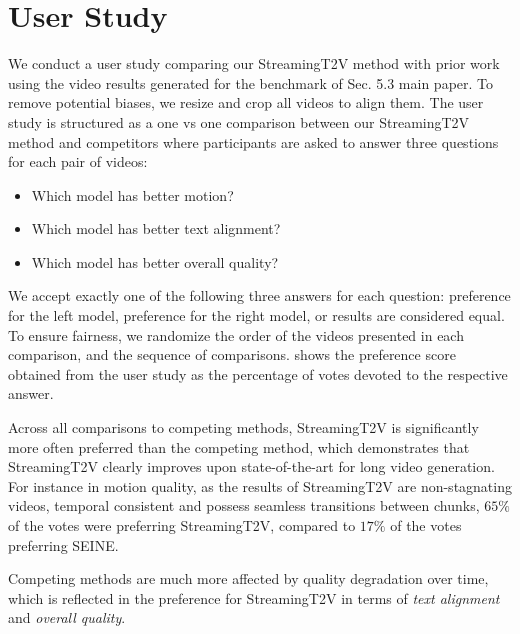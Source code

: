 \section{User Study}
\label{appendix:sec:user_study}
We conduct a user study comparing our StreamingT2V method with prior work using the video results generated for the benchmark  of 
Sec. \textcolor{linkblue}{5.3} main paper.
To remove potential biases, we resize and crop all videos to align them. 
The user study is structured as a one vs one comparison between our StreamingT2V method and competitors where participants are asked to answer three questions for each pair of videos:
\begin{itemize}
    \item Which model has better motion? 
    \item Which model has better text alignment?
    \item Which model has better overall quality?
\end{itemize}
We accept exactly one of the following three answers for each question: preference for the left model, preference for the right model, or results are considered equal. To ensure fairness, we randomize the order of the videos presented in each comparison, and the sequence of comparisons.  shows the  preference score obtained from the user study as the percentage of votes devoted to the respective answer.

Across all comparisons to competing methods, StreamingT2V is significantly more often preferred than the competing method, which demonstrates that StreamingT2V clearly improves upon state-of-the-art for long video generation. For instance in motion quality, as the results of StreamingT2V are non-stagnating videos, temporal consistent and possess seamless transitions between chunks, $65\%$ of the votes were preferring StreamingT2V, compared to  $17\%$ of the votes preferring SEINE.  

Competing methods are much more affected by quality degradation over time, which is reflected in the preference for  StreamingT2V in terms of \textit{text alignment} and \textit{overall quality}.


